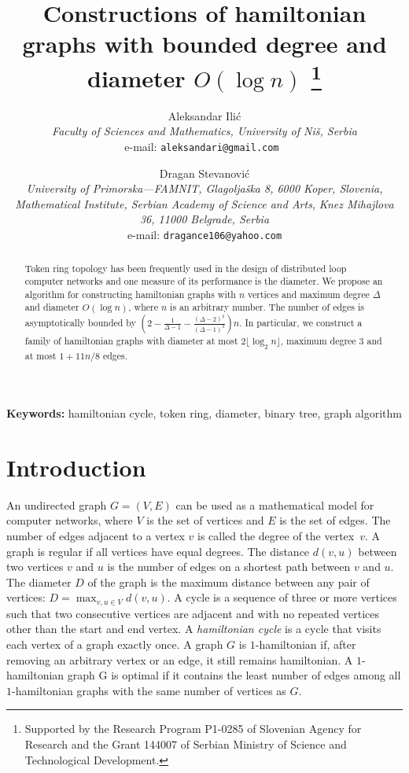 \documentclass[10pt,a4paper]{article}
\title { \bigskip
    \bf {Constructions of hamiltonian graphs with
    bounded degree and diameter $O (\log n)$}
    \thanks{Supported by the Research Program P1-0285 of Slovenian Agency for Research and the Grant 144007 of Serbian Ministry of Science and Technological Development.}
}
\author
{
{\large \sc Aleksandar Ili\' c\footnotemark[3]} \\
{\em \normalsize Faculty of Sciences and Mathematics, University of Ni\v s, Serbia} \\
{\normalsize e-mail: { \tt aleksandari@gmail.com }} \and
{\large \sc Dragan Stevanovi\' c} \\
{\em \normalsize University of Primorska---FAMNIT, Glagolja\v ska 8, 6000 Koper, Slovenia,} \\
{\em \normalsize Mathematical Institute, Serbian Academy of Science
and Arts,}
{\em \normalsize Knez Mihajlova 36, 11000 Belgrade, Serbia }\\
{\normalsize e-mail: { \tt dragance106@yahoo.com}} }
\newcommand{\rz}{\vspace{0.1cm}}
\begin{document}
\maketitle

\vspace{-0.5cm}


\begin{abstract}
    Token ring topology has been frequently used in the design of
    distributed loop computer networks and one measure
    of its performance is the diameter. We
    propose an algorithm for constructing hamiltonian graphs with $n$
    vertices and maximum degree $\Delta$ and diameter $O (\log n)$,
    where $n$ is an arbitrary number. The number of edges is asymptotically bounded by
    $( 2 - \frac{1}{\Delta - 1} - \frac{(\Delta - 2)^2}{(\Delta - 1)^3}) n$.
    In particular, we construct a family of hamiltonian
    graphs with diameter at most $2 \lfloor \log_2 n \rfloor$,
    maximum degree $3$ and at most $1+11n/8$ edges.
\end{abstract}

{\bf {Keywords:}} hamiltonian cycle, token ring, diameter, binary
tree, graph algorithm \rz



\section{Introduction}



An undirected graph $G = (V, E)$ can be used as a mathematical model
for computer networks, where $V$ is the set of vertices and $E$ is
the set of edges. The number of edges adjacent to a vertex $v$ is
called the degree of the vertex~$v$. A graph is regular if all
vertices have equal degrees. The distance $d (v, u)$ between two
vertices $v$ and $u$ is the number of edges on a shortest path
between $v$ and $u$. The diameter $D$ of the graph is the maximum
distance between any pair of vertices: $D = \max_{v, u \in V} d(v,
u)$. A cycle is a sequence of three or more vertices such that two
consecutive vertices are adjacent and with no repeated vertices
other than the start and end vertex. A \emph{hamiltonian cycle} is a
cycle that visits each vertex of a graph exactly once. A graph $G$
is $1$-hamiltonian if, after removing an arbitrary vertex or an
edge, it still remains hamiltonian. A $1$-hamiltonian graph G is
optimal if it contains the least number of edges among all
$1$-hamiltonian graphs with the same number of vertices as $G$. \rz
\end{document}
